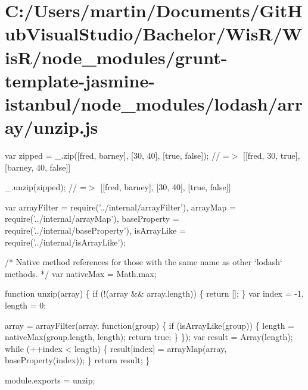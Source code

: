 \hypertarget{_c_1_2_users_2martin_2_documents_2_git_hub_visual_studio_2_bachelor_2_wis_r_2_wis_r_2node_module612e27692c25de897e58c7126c92a00c}{}\section{C\+:/\+Users/martin/\+Documents/\+Git\+Hub\+Visual\+Studio/\+Bachelor/\+Wis\+R/\+Wis\+R/node\+\_\+modules/grunt-\/template-\/jasmine-\/istanbul/node\+\_\+modules/lodash/array/unzip.\+js}
var zipped = \+\_\+.\+zip(\mbox{[}\textquotesingle{}fred\textquotesingle{}, \textquotesingle{}barney\textquotesingle{}\mbox{]}, \mbox{[}30, 40\mbox{]}, \mbox{[}true, false\mbox{]}); // =$>$ \mbox{[}\mbox{[}\textquotesingle{}fred\textquotesingle{}, 30, true\mbox{]}, \mbox{[}\textquotesingle{}barney\textquotesingle{}, 40, false\mbox{]}\mbox{]}

\+\_\+.\+unzip(zipped); // =$>$ \mbox{[}\mbox{[}\textquotesingle{}fred\textquotesingle{}, \textquotesingle{}barney\textquotesingle{}\mbox{]}, \mbox{[}30, 40\mbox{]}, \mbox{[}true, false\mbox{]}\mbox{]}


\begin{DoxyCodeInclude}
var arrayFilter = require(\textcolor{stringliteral}{'../internal/arrayFilter'}),
    arrayMap = require(\textcolor{stringliteral}{'../internal/arrayMap'}),
    baseProperty = require(\textcolor{stringliteral}{'../internal/baseProperty'}),
    isArrayLike = require(\textcolor{stringliteral}{'../internal/isArrayLike'});

\textcolor{comment}{/* Native method references for those with the same name as other `lodash` methods. */}
var nativeMax = Math.max;

\textcolor{keyword}{function} unzip(array) \{
  \textcolor{keywordflow}{if} (!(array && array.length)) \{
    \textcolor{keywordflow}{return} [];
  \}
  var index = -1,
      length = 0;

  array = arrayFilter(array, \textcolor{keyword}{function}(group) \{
    \textcolor{keywordflow}{if} (isArrayLike(group)) \{
      length = nativeMax(group.length, length);
      \textcolor{keywordflow}{return} \textcolor{keyword}{true};
    \}
  \});
  var result = Array(length);
  \textcolor{keywordflow}{while} (++index < length) \{
    result[index] = arrayMap(array, baseProperty(index));
  \}
  \textcolor{keywordflow}{return} result;
\}

module.exports = unzip;
\end{DoxyCodeInclude}
 